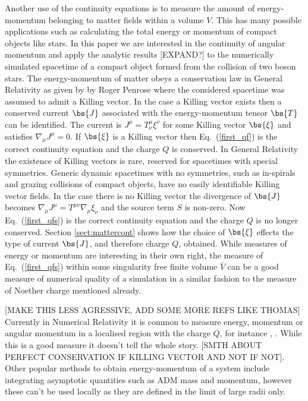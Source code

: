 Another use of the continuity equations is to measure the amount of energy-momentum belonging to matter fields within a volume $V$. This has many possible applications such as calculating the total energy or momentum of compact objects like stars. In this paper we are interested in the continuity of angular momentum and apply the analytic results [EXPAND?] to the numerically simulated spacetime of a compact object formed from the collision of two boson stars. The energy-momentum of matter obeys a conservation law in General Relativity as given by by Roger Penrose \cite{10.2307/2397365} where the considered spacetime was assumed to admit a Killing vector. In the case a Killing vector exists then a conserved current $\bs{J}$ associated with the energy-momentum tensor $\bs{T}$ can be identified. The current is $J^\mu = T^\mu_\nu \xi^\nu$ for some Killing vector $\bs{\xi}$ and satisfies $\nabla_\mu J^\mu = 0$. If $\bs{\xi}$ is a Killing vector then Eq.~(\ref{first_qf}) is the correct continuity equation and the charge $Q$ is conserved. In General Relativity the existence of Killing vectors is rare, reserved for spacetimes with special symmetries. Generic dynamic spacetimes with no symmetries, such as in-spirals and grazing collisions of compact objects, have no easily identifiable Killing vector fields. In the case there is no Killing vector the divergence of $\bs{J}$ becomes $\nabla_\mu J^\mu = T^{\mu\nu}\nabla_\mu \xi_\nu$ and the source term ${S}$ is non-zero. Now Eq.~(\ref{first_qfs}) is the correct continuity equation and the charge $Q$ is no longer conserved. Section \ref{sect:mattercont} shows how the choice of $\bs{\xi}$ effects the type of current $\bs{J}$, and therefore charge $Q$, obtained. While measures of energy or momentum are interesting in their own right, the measure of Eq.~(\ref{first_qfs}) within some singularity free finite volume $\bar{V}$ can be a good measure of numerical quality of a simulation in a similar fashion to the measure of Noether charge mentioned already. 

[MAKE THIS LESS AGRESSIVE, ADD SOME MORE REFS LIKE THOMAS] Currently in Numerical Relativity it is common to measure energy, momentum or angular momentum in a localised region with the charge ${Q}$, for instance \cite{Sanchis_Gual_2019}, \cite{Di_Giovanni_2020}. While this is a good measure it doesn't tell the whole story. [SMTH ABOUT PERFECT CONSERVATION IF KILLING VECTOR AND NOT IF NOT]. Other popular methods to obtain energy-momentum of a system include integrating asymptotic quantities such as ADM mass and momentum, however these can't be used locally as they are defined in the limit of large radii only.

